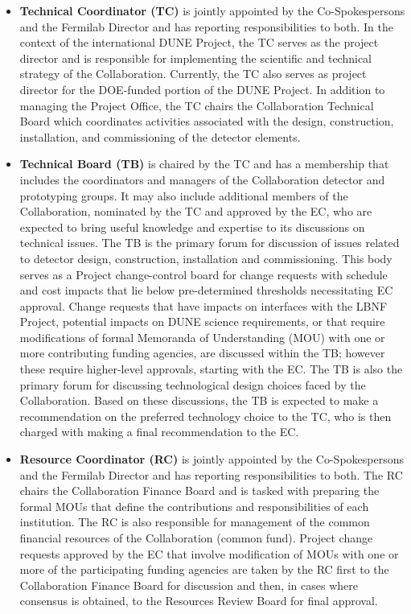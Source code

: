 \begin{itemize}
\item \textbf{Technical Coordinator (TC)} is jointly appointed by the Co-Spokespersons and the Fermilab Director and has reporting responsibilities to both.  In the context of the international DUNE Project, the TC serves as the project director 
and is responsible for implementing the scientific and technical strategy of the Collaboration.  Currently, the TC also serves as project director for the DOE-funded portion of the DUNE Project.  In addition to managing the Project Office, the TC chairs the Collaboration Technical Board which coordinates activities associated with the design, construction, installation, and commissioning of the %
detector elements.
\item \textbf{Technical Board (TB)} is chaired by the TC and has a membership that includes the coordinators and managers of the Collaboration detector and prototyping groups.  It may also include additional members of the Collaboration, nominated by the TC and approved by the EC, who are expected to bring useful knowledge and expertise to its discussions on technical issues.  The TB is the primary %
forum for discussion of issues related to %
detector design, construction, installation and commissioning. %
This body serves as a Project change-control board for change requests with schedule and cost impacts that lie below pre-determined thresholds necessitating EC approval.  Change requests that have impacts on interfaces with the LBNF Project, %
potential impacts on DUNE science requirements, or that require modifications of formal Memoranda of Understanding (MOU) with one or more 
contributing funding agencies, are discussed within the TB; however these require higher-level approvals, starting with the EC.  The TB is also the primary forum for discussing technological design choices faced by the Collaboration.  Based on these discussions, the TB is expected to make a recommendation on the preferred technology choice to the TC, who is then charged with making a final recommendation to the EC. %
\item \textbf{Resource Coordinator (RC)} is jointly appointed by the Co-Spokespersons and the Fermilab Director and has reporting responsibilities to both.  The RC chairs the Collaboration Finance Board and is tasked with preparing the formal MOUs that define the contributions and responsibilities of each institution.  The RC is also responsible for management of the common financial resources of the Collaboration (common fund).  Project change requests approved by the EC that involve modification of MOUs with one or more of the participating funding agencies are taken by the RC first to the Collaboration Finance Board for discussion and then, in cases where consensus is obtained, to the Resources Review Board for final approval.

\end{itemize}
